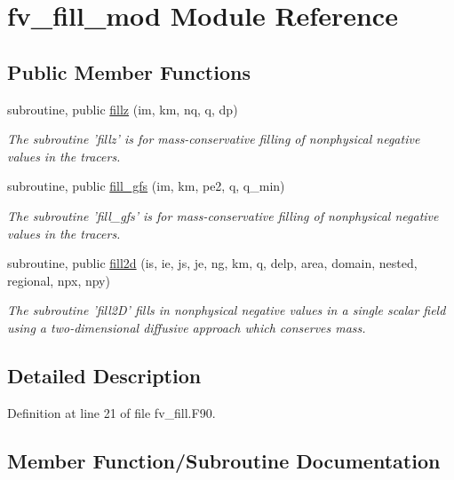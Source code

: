 \section{fv\-\_\-fill\-\_\-mod Module Reference}
\label{classfv__fill__mod}
\subsection*{Public Member Functions}
\begin{DoxyCompactItemize}
\item 
subroutine, public \hyperlink{classfv__fill__mod_a41d77a13ceec78e4ea68f5e5266c9458}{fillz} (im, km, nq, q, dp)
\begin{DoxyCompactList}\small\item\em The subroutine 'fillz' is for mass-\/conservative filling of nonphysical negative values in the tracers. \end{DoxyCompactList}\item 
subroutine, public \hyperlink{classfv__fill__mod_a527172ca182ebcb99a72bdbd536165d2}{fill\-\_\-gfs} (im, km, pe2, q, q\-\_\-min)
\begin{DoxyCompactList}\small\item\em The subroutine 'fill\-\_\-gfs' is for mass-\/conservative filling of nonphysical negative values in the tracers. \end{DoxyCompactList}\item 
subroutine, public \hyperlink{classfv__fill__mod_ac0fe86d6b2444a934aaca81bc8ace0c9}{fill2d} (is, ie, js, je, ng, km, q, delp, area, domain, nested, regional, npx, npy)
\begin{DoxyCompactList}\small\item\em The subroutine 'fill2\-D' fills in nonphysical negative values in a single scalar field using a two-\/dimensional diffusive approach which conserves mass. \end{DoxyCompactList}\end{DoxyCompactItemize}


\subsection{Detailed Description}


Definition at line 21 of file fv\-\_\-fill.\-F90.



\subsection{Member Function/\-Subroutine Documentation}
